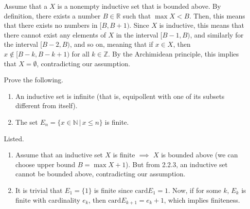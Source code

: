 \documentclass{article}
\begin{document}
    \begin{solution}
    Assume that a $X$ is a nonempty inductive set that is bounded above. By definition, there exists a number $B \in \mathbb{R}$ such that $\max{X} < B$. Then, this means that there exists no numbers in $[B, B + 1)$. Since $X$ is inductive, this means that there cannot exist any elements of $X$ in the interval $[B-1, B)$, and similarly for the interval $[B-2, B)$, and so on, meaning that if $x \in X$, then $x \not\in [B-k, B-k + 1)$ for all $k\in \mathbb{Z}$. By the Archimidean principle, this implies that $X = \emptyset$, contradicting our assumption. 
    \end{solution}

    \begin{exercise}[Zorich 2.2.4]
    Prove the following. 
    \begin{enumerate}
        \item An inductive set is infinite (that is, equipollent with one of its subsets different from itself). 
        \item The set $E_n = \{x \in \mathbb{N}\,|\, x \leq n\}$ is finite. 
    \end{enumerate}
    \end{exercise}

    \begin{solution}
    Listed. 
    \begin{enumerate}
        \item Assume that an inductive set $X$ is finite $\implies$ $X$ is bounded above (we can choose upper bound $B = \max{X} + 1$). But from 2.2.3, an inductive set cannot be bounded above, contradicting our assumption. 
        \item It is trivial that $E_1 = \{1\}$ is finite since $\text{card}{E_1} = 1$. Now, if for some $k$, $E_k$ is finite with cardinality $e_k$, then $\text{card}{E_{k+1}} = e_k + 1$, which implies finiteness.  
    \end{enumerate}
    \end{solution}
\end{document}
